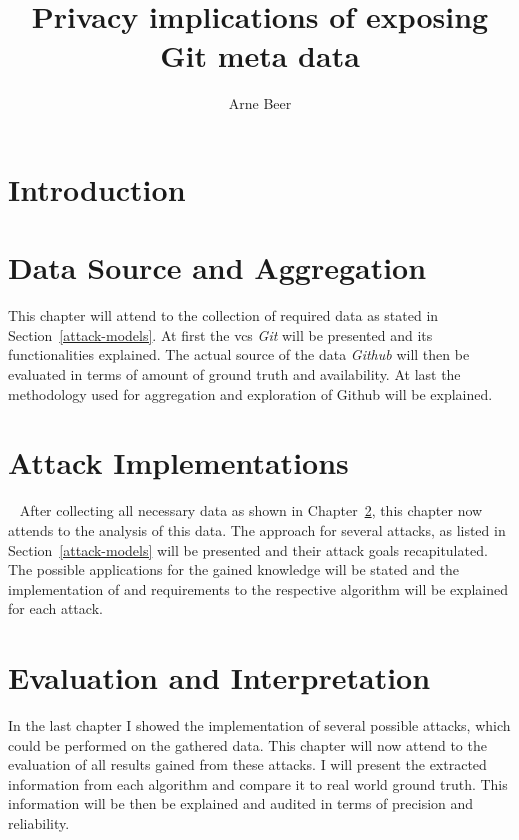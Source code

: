 \documentclass{thesis}
\title{Privacy implications of exposing Git meta data}
\author{Arne Beer}
\begin{document}

\cleardoublepage{}


\clearpage



{\small \tableofcontents}



\chapter{Introduction}




\chapter{Data Source and Aggregation}\label{data}
This chapter will attend to the collection of required data as stated in Section~\ref{attack-models}.
At first the \ac{vcs} \emph{Git} will be presented and its functionalities explained.
The actual source of the data \emph{Github} will then be evaluated in terms of amount of ground truth and availability.
At last the methodology used for aggregation and exploration of Github will be explained.








\chapter{Attack Implementations}~\label{implementation}
After collecting all necessary data as shown in Chapter~\ref{data}, this chapter now attends to the analysis of this data.
The approach for several attacks, as listed in Section~\ref{attack-models} will be presented and their attack goals recapitulated.
The possible applications for the gained knowledge will be stated and the implementation of and requirements to the respective algorithm will be explained for each attack.







\chapter{Evaluation and Interpretation}\label{evaluation}
In the last chapter I showed the implementation of several possible attacks, which could be performed on the gathered data.
This chapter will now attend to the evaluation of all results gained from these attacks.
I will present the extracted information from each algorithm and compare it to real world ground truth.
This information will be then be explained and audited in terms of precision and reliability.
\end{document}
